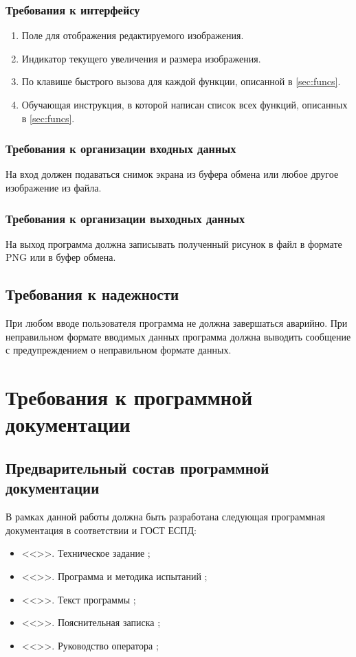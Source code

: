 \documentclass[a4paper,12pt]{article}
\begin{document}
  \subsubsection{Требования к интерфейсу}
  \begin{enumerate}
    \item Поле для отображения редактируемого изображения.
    \item Индикатор текущего увеличения и размера изображения.
    \item По клавише быстрого вызова для каждой функции, описанной в \autoref{sec:funcs}.
    \item Обучающая инструкция, в которой написан список всех функций, описанных в \autoref{sec:funcs}.
  \end{enumerate}

  \subsubsection{Требования к организации входных данных}
  На вход должен подаваться снимок экрана из буфера обмена или любое другое изображение из файла.
  \subsubsection{Требования к организации выходных данных}
  На выход программа должна записывать полученный рисунок в файл в формате PNG или в буфер обмена.
  \subsection{Требования к надежности}
  При любом вводе пользователя программа не должна завершаться аварийно.
  При неправильном формате вводимых данных программа должна выводить сообщение с предупреждением о неправильном формате данных.

  \newpage
  \section{Требования к программной документации}
  \subsection{Предварительный состав программной документации}
  \label{sec:doclist}
  В рамках данной работы должна быть разработана следующая программная документация в соответствии и ГОСТ ЕСПД:
  \begin{itemize}
    \item <<\CRTname>>. Техническое задание \cite{gostTZ};
    \item <<\CRTname>>. Программа и методика испытаний \cite{gostPMI};
    \item <<\CRTname>>. Текст программы \cite{gostTP};
    \item <<\CRTname>>. Пояснительная записка \cite{gostPZ};
    \item <<\CRTname>>. Руководство оператора \cite{gostRO};
  \end{itemize}
\end{document}
